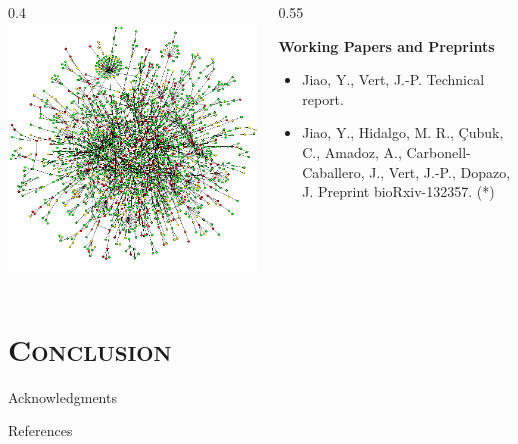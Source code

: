 \documentclass[xcolor=x11names,compress]{beamer}
\theoremstyle{plain}
\renewcommand{\(}{\begin{columns}}
\renewcommand{\)}{\end{columns}}
\newcommand{\<}[1]{\begin{column}{#1}}
\renewcommand{\>}{\end{column}}
\newcommand{\addsectiontitlepage}{
	\hfill\leavevmode
  \vtop{
    \huge\hbox{\color{myblue}\insertsection}
    \kern.5ex %
    \vspace{1cm}
  }
}
\begin{document}
\begin{frame}
	
	\addsectiontitlepage
	
	\(
	\<{0.4\linewidth}
	\includegraphics[width=\columnwidth]{slides/ppi}
	\>
	
	\<{0.55\linewidth}
	\begin{footnotesize}
	\textbf{Working Papers and Preprints}
	\begin{itemize}
		\item \nocite{Jiao2017Network} Jiao, Y., Vert, J.-P. Technical report.
		\item \nocite{Jiao2017Signaling} Jiao, Y., Hidalgo, M. R., \c{C}ubuk, C., Amadoz, A., Carbonell-Caballero, J., Vert, J.-P., Dopazo, J. Preprint bioRxiv-132357. (*)
	\end{itemize}
	\end{footnotesize}
	\>
	\)
	
\end{frame}


\section{\scshape Conclusion}


\begin{frame}{\insertsection}
	
\end{frame}


\begin{frame}{Acknowledgments}
	
\end{frame}


\begin{frame}[allowframebreaks]{References}
	
	\footnotesize
	
	
	
\end{frame}
\end{document}
